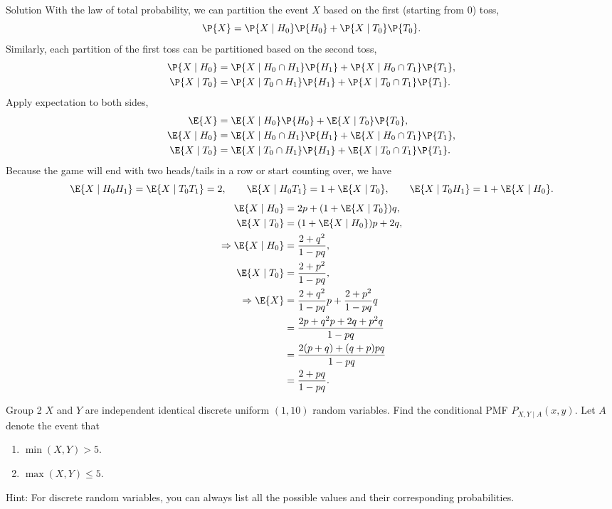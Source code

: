 \documentclass{article}
\theoremstyle{plain}
\theoremstyle{definition}
\theoremstyle{remark}
\begin{document}
\begin{solution}
    {Solution}
    With the law of total probability, we can partition the event $X$ based on the first (starting from $0$) toss,
    \[
        \P{X}=\P{X\mid H_0}\P{H_0}+\P{X\mid T_0}\P{T_0}.
    \]
    Similarly, each partition of the first toss can be partitioned based on the second toss,
    \begin{align*}
        \P{X\mid H_0} &= \P{X\mid H_0\cap H_1}\P{H_1}+\P{X\mid H_0\cap T_1}\P{T_1}, \\
        \P{X\mid T_0} &= \P{X\mid T_0\cap H_1}\P{H_1}+\P{X\mid T_0\cap T_1}\P{T_1}.
    \end{align*}
    Apply expectation to both sides,
    \begin{align*}
        \E{X} &= \E{X\mid H_0}\P{H_0}+\E{X\mid T_0}\P{T_0}, \\
        \E{X\mid H_0} &= \E{X\mid H_0\cap H_1}\P{H_1}+\E{X\mid H_0\cap T_1}\P{T_1}, \\
        \E{X\mid T_0} &= \E{X\mid T_0\cap H_1}\P{H_1}+\E{X\mid T_0\cap T_1}\P{T_1}.
    \end{align*}
    Because the game will end with two heads/tails in a row or start counting over, we have
    \[
    \E{X\mid H_0H_1}= \E{X\mid T_0T_1}=2, \qquad \E{X\mid H_0T_1} = 1+\E{X\mid T_0}, \qquad \E{X\mid T_0H_1} = 1+\E{X\mid H_0}.
    \]
    \begin{align*}
        \E{X\mid H_0} &= 2p+(1+\E{X\mid T_0})q, \\
        \E{X\mid T_0} &= (1+\E{X\mid H_0})p+2q, \\
        \Rightarrow
        \E{X\mid H_0} &= \frac{2+q^2}{1-pq}, \\
        \E{X\mid T_0} &= \frac{2+p^2}{1-pq}, \\
        \Rightarrow
        \E{X} &= \frac{2+q^2}{1-pq}p+\frac{2+p^2}{1-pq}q \\
        &= \frac{2p+q^2p+2q+p^2q}{1-pq} \\
        &= \frac{2(p+q)+(q+p)pq}{1-pq} \\
        &= \frac{2+pq}{1-pq}.
    \end{align*}
\end{solution}

\begin{problem}
    {Group 2}
    $X$ and $Y$ are independent identical discrete uniform $(1, 10)$ random variables. Find the conditional PMF $P_{X,Y \mid A}(x, y)$. Let $A$ denote the event that
    \begin{enumerate}
        \item $\min(X, Y) > 5$.
        \item $\max(X, Y) \leq 5$.
    \end{enumerate}
    \begin{solution}
        {Hint:}
        For discrete random variables, you can always list all the possible values and their corresponding probabilities.
    \end{solution}
\end{problem}
\end{document}
